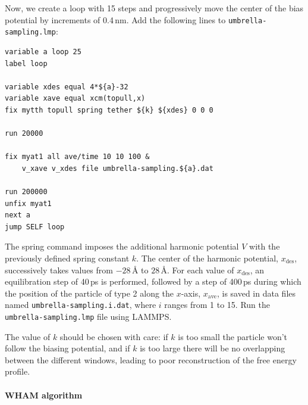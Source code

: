 \documentclass[9pt,tutorial]{livecoms}
\newcommand{\lmpcmd}[1]{\hspace{0pt}\colorbox{listing}{\textcolor{command}{\small{#1}}}\hspace{0pt}} %
\newcommand{\flecmd}[1]{\textcolor{command}{\texttt{#1}}} %
\begin{document}
Now, we create a loop with 15 steps and progressively move the center of the
bias potential by increments of 0.4\,nm.  Add the following lines to \flecmd{umbrella-sampling.lmp}:
\begin{lstlisting}
variable a loop 25
label loop

variable xdes equal 4*${a}-32
variable xave equal xcm(topull,x)
fix mytth topull spring tether ${k} ${xdes} 0 0 0

run 20000

fix myat1 all ave/time 10 10 100 &
    v_xave v_xdes file umbrella-sampling.${a}.dat

run 200000
unfix myat1
next a
jump SELF loop
\end{lstlisting}
The \lmpcmd{spring} command imposes the additional harmonic potential $V$ with
the previously defined spring constant $k$.  The center of the harmonic
potential, $x_\text{des}$, successively takes values
from $-28\,\text{\AA{}}$ to $28\,\text{\AA{}}$.  For each value of $x_\text{des}$,
an equilibration step of 40\,ps is performed, followed by a step
of 400\,ps during which the position of the particle of
type 2 along the $x$-axis, $x_\text{ave}$, is saved in data files named \flecmd{umbrella-sampling.i.dat},
where $i$ ranges from 1 to 15.  Run the \flecmd{umbrella-sampling.lmp} file using LAMMPS.

\begin{note}
The value of $k$ should be chosen with care:
if $k$ is too small the particle won't follow the biasing potential,
and if $k$ is too large there will be no overlapping between
the different windows, leading to poor reconstruction of the free energy profile.
\end{note}

\paragraph{WHAM algorithm}
\end{document}
